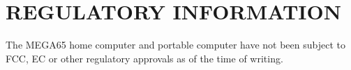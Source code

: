 \chapter*{REGULATORY INFORMATION}

The MEGA65 home computer and portable computer have not been subject to FCC, EC
or other regulatory approvals as of the time of writing.
